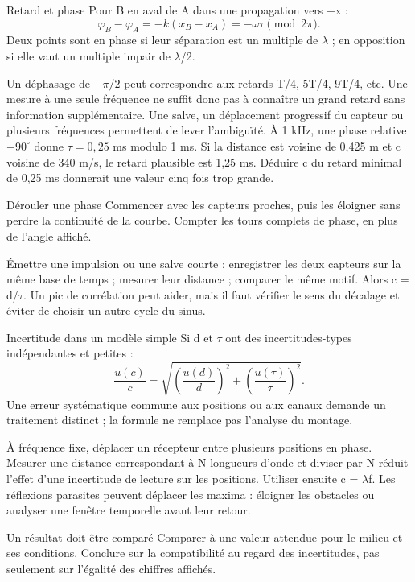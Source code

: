 \begin{loi}{Retard et phase}
Pour B en aval de A dans une propagation vers +x :\[\varphi_B-\varphi_A=-k(x_B-x_A)=-\omega\tau\pmod{2\pi}.\]Deux points sont en phase si leur séparation est un multiple de \ensuremath{\lambda} ; en opposition si elle vaut un multiple impair de \ensuremath{\lambda}/2.
\end{loi}
Un déphasage de $-\pi/2$ peut correspondre aux retards T/4, 5T/4, 9T/4, etc. Une mesure à une seule fréquence ne suffit donc pas à connaître un grand retard sans information supplémentaire. Une salve, un déplacement progressif du capteur ou plusieurs fréquences permettent de lever l’ambiguïté.
À 1 kHz, une phase relative $-90^\circ$ donne $\tau=0{,}25$ ms modulo 1 ms. Si la distance est voisine de 0,425 m et c voisine de 340 m/s, le retard plausible est 1,25 ms. Déduire c du retard minimal de 0,25 ms donnerait une valeur cinq fois trop grande.
\begin{methode}{Dérouler une phase}
Commencer avec les capteurs proches, puis les éloigner sans perdre la continuité de la courbe. Compter les tours complets de phase, en plus de l’angle affiché.
\end{methode}


Émettre une impulsion ou une salve courte ; enregistrer les deux capteurs sur la même base de temps ; mesurer leur distance ; comparer le même motif. Alors c = d/\ensuremath{\tau}. Un pic de corrélation peut aider, mais il faut vérifier le sens du décalage et éviter de choisir un autre cycle du sinus.
\begin{loi}{Incertitude dans un modèle simple}
Si d et \ensuremath{\tau} ont des incertitudes-types indépendantes et petites :\[\frac{u(c)}c=\sqrt{\left(\frac{u(d)}d\right)^2+\left(\frac{u(\tau)}\tau\right)^2}.\]Une erreur systématique commune aux positions ou aux canaux demande un traitement distinct ; la formule ne remplace pas l’analyse du montage.
\end{loi}
À fréquence fixe, déplacer un récepteur entre plusieurs positions en phase. Mesurer une distance correspondant à N longueurs d’onde et diviser par N réduit l’effet d’une incertitude de lecture sur les positions. Utiliser ensuite c = \ensuremath{\lambda}f. Les réflexions parasites peuvent déplacer les maxima : éloigner les obstacles ou analyser une fenêtre temporelle avant leur retour.
\begin{docu}{Un résultat doit être comparé}
Comparer à une valeur attendue pour le milieu et ses conditions. Conclure sur la compatibilité au regard des incertitudes, pas seulement sur l’égalité des chiffres affichés.
\end{docu}


